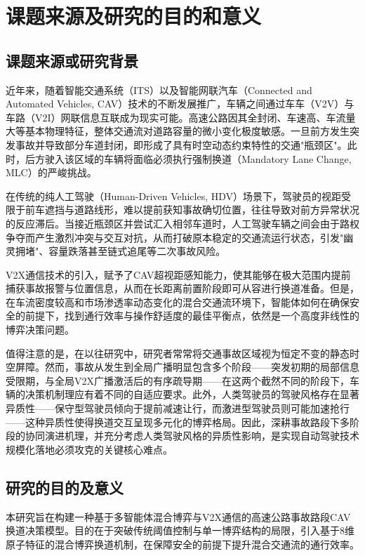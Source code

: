 \section{课题来源及研究的目的和意义}
\subsection{课题来源或研究背景}
近年来，随着智能交通系统（ITS）以及智能网联汽车（Connected and Automated Vehicles, CAV）技术的不断发展推广，车辆之间通过车车（V2V）与车路（V2I）网联信息互联成为现实可能。高速公路因其全封闭、车速高、车流量大等基本物理特征，整体交通流对道路容量的微小变化极度敏感。一旦前方发生突发事故并导致部分车道封闭，即形成了具有时空动态约束特性的交通"瓶颈区"。此时，后方驶入该区域的车辆将面临必须执行强制换道（Mandatory Lane Change, MLC）的严峻挑战。

在传统的纯人工驾驶（Human-Driven Vehicles, HDV）场景下，驾驶员的视距受限于前车遮挡与道路线形，难以提前获知事故确切位置，往往导致对前方异常状况的反应滞后。当接近瓶颈区并尝试汇入相邻车道时，人工驾驶车辆之间会由于路权争夺而产生激烈冲突与交互对抗，从而打破原本稳定的交通流运行状态，引发"幽灵拥堵"、容量跌落甚至链式追尾等二次事故风险。

V2X通信技术的引入，赋予了CAV超视距感知能力，使其能够在极大范围内提前捕获事故报警与位置信息，从而在长距离前置阶段即可从容进行换道准备。但是，在车流密度较高和市场渗透率动态变化的混合交通流环境下，智能体如何在确保安全的前提下，找到通行效率与操作舒适度的最佳平衡点，依然是一个高度非线性的博弈决策问题。

值得注意的是，在以往研究中，研究者常常将交通事故区域视为恒定不变的静态时空屏障。然而，事故从发生到全局广播明显包含多个阶段——突发初期的局部信息受限期，与全局V2X广播激活后的有序疏导期——在这两个截然不同的阶段下，车辆的决策机制理应有着不同的自适应要求。此外，人类驾驶员的驾驶风格存在显著异质性——保守型驾驶员倾向于提前减速让行，而激进型驾驶员则可能加速抢行——这种异质性使得换道交互呈现多元化的博弈格局。因此，深耕事故路段下多阶段的协同演进机理，并充分考虑人类驾驶风格的异质性影响，是实现自动驾驶技术规模化落地必须攻克的关键核心难点。

\subsection{研究的目的及意义}
本研究旨在构建一种基于多智能体混合博弈与V2X通信的高速公路事故路段CAV换道决策模型。目的在于突破传统阈值控制与单一博弈结构的局限，引入基于8维原子特征的混合博弈换道机制，在保障安全的前提下提升混合交通流的通行效率。

